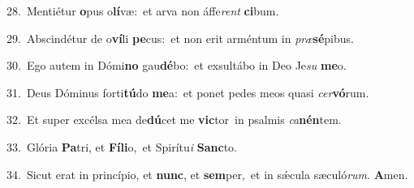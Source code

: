 {\numbfont\textcolor{\numbcolor}{28.}}~Mentiétur \textbf{o}\-pus o\-\textbf{lí}\-væ:~\star et arva non áffe\textit{rent} \textbf{ci}\-bum.\par
{\numbfont\textcolor{\numbcolor}{29.}}~Abscindétur de o\-\textbf{ví}\-li \textbf{pe}\-cus:~\star et non erit arméntum in \textit{præ}\-\textbf{sé}pibus.\par
{\numbfont\textcolor{\numbcolor}{30.}}~Ego autem in Dómi\textbf{no} gau\-\textbf{dé}\-bo:~\star et exsultábo in Deo Je\textit{su} \textbf{me}\-o.\par
{\numbfont\textcolor{\numbcolor}{31.}}~Deus Dóminus forti\-\textbf{tú}\-do \textbf{me}\-a:~\star et ponet pedes meos quasi \textit{cer}\-\textbf{vó}rum.\par
{\numbfont\textcolor{\numbcolor}{32.}}~Et super excélsa mea de\-\textbf{dú}\-cet me \textbf{vic}\-tor~\star in psalmis \textit{ca}\-\textbf{nén}tem.\par
{\numbfont\textcolor{\numbcolor}{33.}}~Glória \textbf{Pa}\-tri, et \textbf{Fí}\-\textbf{li}o,~\star et Spirítu\textit{i} \textbf{Sanc}\-to.\par
{\numbfont\textcolor{\numbcolor}{34.}}~Sicut erat in princípio, et \textbf{nunc}\-, et \textbf{sem}\-per,~\star et in sǽcula sæculó\-\textit{rum}\-. \textbf{A}\-men.\par
